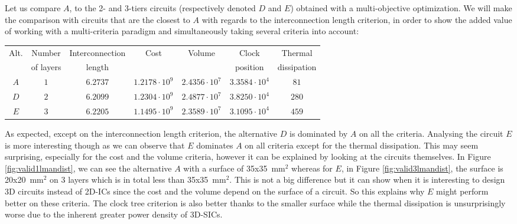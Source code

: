 Let us compare $A$, to the 2- and 3-tiers circuits (respectively denoted $D$ and $E$) obtained with a multi-objective optimization. We will make the comparison with circuits that are the closest to $A$ with regards to the interconnection length criterion, in order to show the added value of working with a multi-criteria paradigm and simultaneously taking several criteria into account:
\begin{center}
\begin{footnotesize}
\begin{tabular}{c|c|ccccc}
Alt. & Number & Interconnection & Cost & Volume & Clock & Thermal\\
 & of layers & length & & & position & dissipation\\
\hline
$A$ & $1$ & $6.2737$ & $1.2178\cdot10^9$ & $2.4356\cdot 10^7$ & $3.3584\cdot 10^4$ & $81$ \\
$D$ & $2$ & $6.2099$ & $1.2304\cdot10^9$ & $2.4877\cdot 10^7$ & $3.8250\cdot 10^4$ & $280$ \\
$E$ & $3$ & $6.2205$ & $1.1495\cdot10^9$ & $2.3589\cdot 10^7$ & $3.1095\cdot 10^4$ & $459$ \\
\end{tabular}
\end{footnotesize}
\end{center}
As expected, except on the interconnection length criterion, the alternative $D$ is dominated by $A$ on all the criteria. Analysing the circuit $E$ is more interesting though as we can observe that $E$ dominates $A$ on all criteria except for the thermal dissipation. This may seem surprising, especially for the cost and the volume criteria, however it can be explained by looking at the circuits themselves. In Figure \ref{fig:valid1lmandist}, we can see the alternative $A$ with a surface of \texttildelow 35x35~mm$^2$ whereas for $E$, in Figure \ref{fig:valid3lmandist}, the surface is \texttildelow 20x20~mm$^2$ on 3 layers which is in total less than 35x35~mm$^2$. This is not a big difference but it can show when it is interesting to design 3D circuits instead of 2D-ICs since the cost and the volume depend on the surface of a circuit. So this explains why $E$ might perform better on these criteria. The clock tree criterion is also better thanks to the smaller surface while the thermal dissipation is unsurprisingly worse due to the inherent greater power density of 3D-SICs. 


